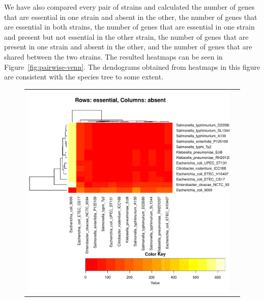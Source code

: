 \documentclass[a4paper,10pt, twocolumn]{article}
\begin{document}
We have also compared every pair of strains and calculated the number of genes that are essential in one strain and absent in the other, the number of genes that are essential in both strains, the number of genes that are essential in one strain and present but not essential in the other strain, the number of genes that are present in one strain and absent in the other, and the number of genes that are shared between the two strains. The resulted heatmaps can be seen in Figure~\ref{fig:pairwise-venn}. The dendograms obtained from heatmaps in this figure are consistent with the species tree to some extent. 

\begin{figure}
\centering
\begin{tabular}{c c}
\includegraphics[page=1, scale=0.35]{essentiality-heatmap.pdf} & 

\end{tabular}
\end{figure}
\end{document}
